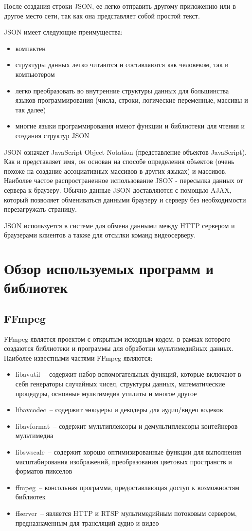 После создания строки JSON, ее легко отправить другому приложению или в другое место сети,
так как она представляет собой простой текст.

\medskip
JSON имеет следующие преимущества:
\smallskip
\begin{itemize}
	\item  компактен
	\item структуры данных легко читаются и составляются как человеком, так и компьютером
	\item легко преобразовать во внутренние структуры данных для большинства языков программирования
	(числа, строки, логические переменные, массивы и так далее)
	\item многие языки программирования имеют функции и библиотеки для чтения и создания структур JSON
\end{itemize}

JSON означает JavaScript Object Notation (представление объектов JavaScript). Как и представляет имя,
он основан на способе определения объектов (очень похоже на создание ассоциативных массивов в других
языках) и массивов.
Наиболее частое распространенное использование JSON - пересылка данных от сервера к браузеру. Обычно
данные JSON доставляются с помощью AJAX, который позволяет обмениваться данными браузеру и серверу без
необходимости перезагружать страницу.

JSON используется в системе для обмена данными между HTTP сервером и браузерами клиентов а также для
отсылки команд видеосерверу.

\section{Обзор используемых программ и библиотек}

\subsection{FFmpeg}
FFmpeg является проектом с открытым исходным кодом, в рамках которого создаются библиотеки и
программы для обработки мультимедийных данных.
Наиболее известными частями FFmpeg являются:
\smallskip
\begin{itemize}
	\item
	libavutil~-- содержит набор вспомогательных функций, которые включают в себя генераторы
	случайных чисел, структуры данных, математические процедуры, основные мультимедиа утилиты
	и многое другое
	\item
	libavcodec~-- содержит энкодеры и декодеры для аудио/видео кодеков
	\item
	libavformat~-- содержит мультиплексоры и демультиплексоры контейнеров мультимедиа
	\item
	libswscale~-- содержит хорошо оптимизированные функции для выполнения масштабирования изображений,
	преобразования цветовых пространств и форматов пикселов
	\item
	ffmpeg~-- консольная программа, предоставляющая доступ к возможностям библиотек
	\item
	ffserver~-- является HTTP и RTSP мультимедийным потоковым сервером, предназначенным для трансляций
	аудио и видео
\end{itemize}

